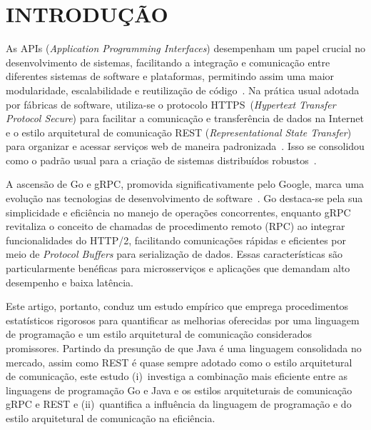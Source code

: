 \chapter{INTRODUÇÃO}

As APIs ({\em Application Programming Interfaces}) desempenham um papel crucial no desenvolvimento de sistemas,
facilitando a integração e comunicação entre diferentes sistemas de software e plataformas, 
permitindo assim uma maior modularidade, escalabilidade e reutilização de código~\cite{apiArchitecture}.
%
Na prática usual adotada por fábricas de software, utiliza-se o protocolo HTTPS~(\textit{Hypertext Transfer Protocol Secure}) para 
facilitar a comunicação e transferência de dados na Internet
e o estilo arquitetural de comunicação REST (\textit{Representational State Transfer}) 
para organizar e acessar serviços web de maneira padronizada~\cite{rfc2616, fielding2000architectural}.
Isso se consolidou como o padrão usual para a criação de sistemas distribuídos robustos~\cite{restPop, apiArchitecture, restRefact}.

A ascensão de Go e gRPC, promovida significativamente pelo Google, marca uma evolução nas tecnologias de desenvolvimento de software~\cite{go2012, grpc2015}. Go destaca-se pela sua simplicidade e eficiência no manejo de operações concorrentes, enquanto gRPC revitaliza o conceito de chamadas de procedimento remoto (RPC) ao integrar funcionalidades do HTTP/2, facilitando comunicações rápidas e eficientes por meio de \textit{Protocol Buffers} para serialização de dados. Essas características são particularmente benéficas para microsserviços e aplicações que demandam alto desempenho e baixa latência.


Este artigo, portanto, conduz um estudo empírico que emprega procedimentos estatísticos rigorosos para quantificar as melhorias oferecidas por uma linguagem de programação e um estilo arquitetural de comunicação considerados promissores.
%
Partindo da presunção de que Java é uma linguagem consolidada no mercado, assim como REST é quase sempre adotado
como o estilo arquitetural de comunicação, este estudo 
(i)~investiga a combinação mais eficiente entre as linguagens de programação Go e Java e os estilos arquiteturais de
comunicação gRPC e REST e
(ii)~quantifica a influência da linguagem de programação e do estilo arquitetural de comunicação na eficiência.

